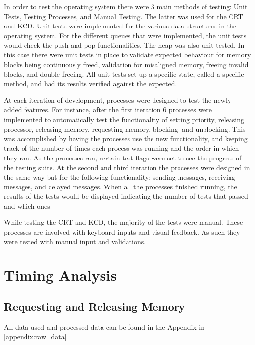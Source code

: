 \documentclass[12pt]{report}
\begin{document}
In order to test the operating system there were 3 main methods of testing: Unit Tests, Testing Processes, and Manual Testing. The latter was used for the CRT and KCD. Unit tests were implemented for the various data structures in the operating system. For the different queues that were implemented, the unit tests would check the push and pop functionalities. The heap was also unit tested. In this case there were unit tests in place to validate expected behaviour for memory blocks being continuously freed, validation for misaligned memory, freeing invalid blocks, and double freeing. All unit tests set up a specific state, called a specific method, and had its results verified against the expected.

At each iteration of development, processes were designed to test the newly added features. For instance, after the first iteration 6 processes were implemented to automatically test the functionality of setting priority, releasing processor, releasing memory, requesting memory, blocking, and unblocking. This was accomplished by having the processes use the new functionality, and keeping track of the number of times each process was running and the order in which they ran. As the processes ran, certain test flags were set to see the progress of the testing suite. At the second and third iteration the processes were designed in the same way but for the following functionality: sending messages, receiving messages, and delayed messages.  When all the processes finished running, the results of the tests would be displayed indicating the number of tests that passed and which ones.

While testing the CRT and KCD, the majority of the tests were manual. These processes are involved with keyboard inputs and visual feedback. As such they were tested with manual input and validations. 


\chapter{Timing Analysis}

\section{Requesting and Releasing Memory}

\par All data used and processed data can be found in the Appendix in \ref{appendix:raw_data}
\end{document}
